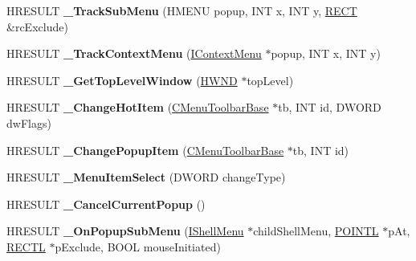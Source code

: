 \begin{DoxyCompactItemize}
\item 
\mbox{\label{class_c_menu_band_a3fba31549a57ab5610909f458c058bed}} 
H\+R\+E\+S\+U\+LT {\bfseries \+\_\+\+Track\+Sub\+Menu} (H\+M\+E\+NU popup, I\+NT x, I\+NT y, \hyperlink{structtag_r_e_c_t}{R\+E\+CT} \&rc\+Exclude)
\item 
\mbox{\label{class_c_menu_band_a3e6e083392d4cd9608206d179327fad8}} 
H\+R\+E\+S\+U\+LT {\bfseries \+\_\+\+Track\+Context\+Menu} (\hyperlink{interface_i_context_menu}{I\+Context\+Menu} $\ast$popup, I\+NT x, I\+NT y)
\item 
\mbox{\label{class_c_menu_band_a25208e8c88270a2d01fdb22226641287}} 
H\+R\+E\+S\+U\+LT {\bfseries \+\_\+\+Get\+Top\+Level\+Window} (\hyperlink{interfacevoid}{H\+W\+ND} $\ast$top\+Level)
\item 
\mbox{\label{class_c_menu_band_aad412395723640d47d1f6364cdccc74a}} 
H\+R\+E\+S\+U\+LT {\bfseries \+\_\+\+Change\+Hot\+Item} (\hyperlink{class_c_menu_toolbar_base}{C\+Menu\+Toolbar\+Base} $\ast$tb, I\+NT id, D\+W\+O\+RD dw\+Flags)
\item 
\mbox{\label{class_c_menu_band_ae80182a83972e697da322306951d3380}} 
H\+R\+E\+S\+U\+LT {\bfseries \+\_\+\+Change\+Popup\+Item} (\hyperlink{class_c_menu_toolbar_base}{C\+Menu\+Toolbar\+Base} $\ast$tb, I\+NT id)
\item 
\mbox{\label{class_c_menu_band_a658ed82db80cf48ac99479161f3e2e00}} 
H\+R\+E\+S\+U\+LT {\bfseries \+\_\+\+Menu\+Item\+Select} (D\+W\+O\+RD change\+Type)
\item 
\mbox{\label{class_c_menu_band_a8f187146a54c0d268b7f7a0c0dde051a}} 
H\+R\+E\+S\+U\+LT {\bfseries \+\_\+\+Cancel\+Current\+Popup} ()
\item 
\mbox{\label{class_c_menu_band_a1f549d923303c118366d66ad38ec46de}} 
H\+R\+E\+S\+U\+LT {\bfseries \+\_\+\+On\+Popup\+Sub\+Menu} (\hyperlink{interface_i_shell_menu}{I\+Shell\+Menu} $\ast$child\+Shell\+Menu, \hyperlink{struct___p_o_i_n_t_l}{P\+O\+I\+N\+TL} $\ast$p\+At, \hyperlink{struct___r_e_c_t_l}{R\+E\+C\+TL} $\ast$p\+Exclude, B\+O\+OL mouse\+Initiated)
\item 

\end{DoxyCompactItemize}
